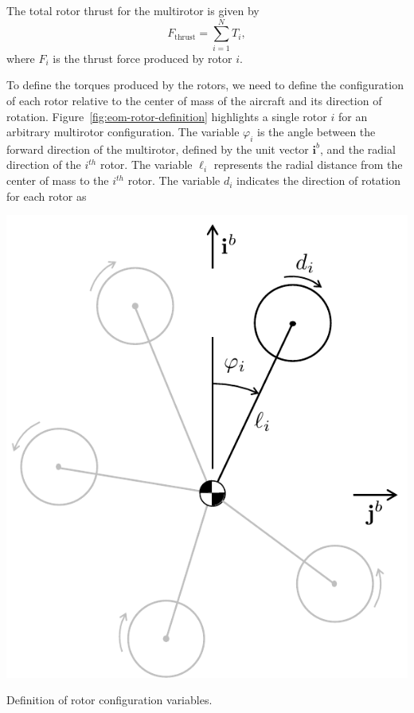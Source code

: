 The total rotor thrust for the multirotor is given by
\begin{equation}
   F_{\text{thrust}} = \sum\limits_{i=1}^N T_i ,
\end{equation}
where $F_i$ is the thrust force produced by rotor $i$.


To define the torques produced by the rotors, we need to define the configuration of each rotor relative to the center of mass of the aircraft and its direction of rotation. Figure~\ref{fig:eom-rotor-definition} highlights a single rotor $i$ for an arbitrary multirotor configuration. The variable $\varphi_i$ is the angle between the forward direction of the multirotor, defined by the unit vector $\mathbf{i}^b$, and the radial direction of the $i^{\mathit{th}}$ rotor. The variable $\ell_i$ represents the radial distance from the center of mass to the $i^{\mathit{th}}$ rotor. The variable $d_i$ indicates the direction of rotation for each rotor as
%
%
\begin{marginfigure}
\includegraphics{chap3_multirotor/figures/eom-rotor-definition}
\caption{Definition of rotor configuration variables.} 
\label{fig:eom-rotor-definition}
\end{marginfigure}
